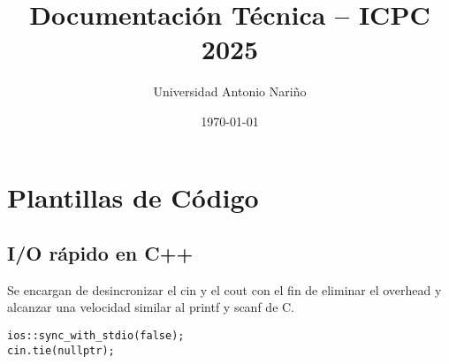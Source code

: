 \documentclass[11pt,a4paper]{article}
\title{Documentación Técnica – ICPC 2025}
\author{Universidad Antonio Nariño}
\date{\today}
\begin{document}
\maketitle
\tableofcontents
\newpage

\section{Plantillas de Código}

\subsection{I/O rápido en C++}
Se encargan de desincronizar el cin y el cout con el fin de eliminar el overhead y alcanzar una velocidad similar al printf y scanf de C.
\begin{lstlisting}
ios::sync_with_stdio(false);
cin.tie(nullptr);
\end{lstlisting}
\end{document}
